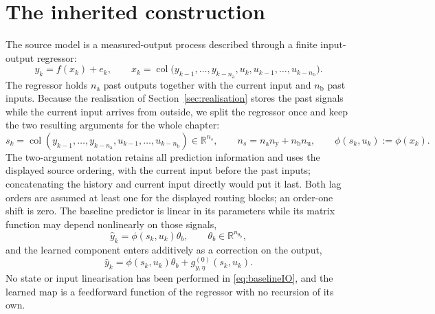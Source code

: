 \documentclass[11pt,a4paper]{article}
\newcommand{\R}{\mathbb R}
\newcommand{\col}{\operatorname{col}}
\theoremstyle{remark}
\begin{document}
\section{The inherited construction}\label{sec:inherited}
The source model is a measured-output process described through a finite input-output
regressor:
\begin{equation*}
y_k=f(x_k)+e_k,\qquad
x_k=\col\bigl(y_{k-1},\ldots,y_{k-n_{\mathrm a}},
u_k,u_{k-1},\ldots,u_{k-n_{\mathrm b}}\bigr).
\end{equation*}
The regressor holds \(n_{\mathrm a}\) past outputs together with the current input and
\(n_{\mathrm b}\) past inputs. Because the realisation of Section~\ref{sec:realisation} stores the
past signals while the current input arrives from outside, we split the regressor once and keep
the two resulting arguments for the whole chapter:
\begin{equation}\label{eq:history}
s_k=\col(y_{k-1},\ldots,y_{k-n_{\mathrm a}},u_{k-1},\ldots,u_{k-n_{\mathrm b}})\in\R^{n_s},
\qquad n_s=n_{\mathrm a}n_{\mathrm y}+n_{\mathrm b}n_{\mathrm u},
\qquad \phi(s_k,u_k):=\phi(x_k).
\end{equation}
The two-argument notation retains all prediction information and uses the displayed source
ordering, with the current input before the past inputs; concatenating the history and current
input directly would put it last. Both lag orders are assumed at least one for the displayed
routing blocks; an order-one shift is zero. The baseline predictor is
linear in its parameters while its matrix function may depend nonlinearly on those signals,
\begin{equation}\label{eq:baselineIO}
\hat y_k=\phi(s_k,u_k)\theta_b,\qquad\theta_b\in\R^{n_{\theta_{\mathrm b}}},
\end{equation}
and the learned component enters additively as a correction on the output,
\begin{equation*}
\hat y_k=\phi(s_k,u_k)\theta_b+g_{y,\eta}^{(0)}(s_k,u_k).
\end{equation*}
No state or input linearisation has been performed in \eqref{eq:baselineIO}, and the learned map
is a feedforward function of the regressor with no recursion of its own.
\end{document}
